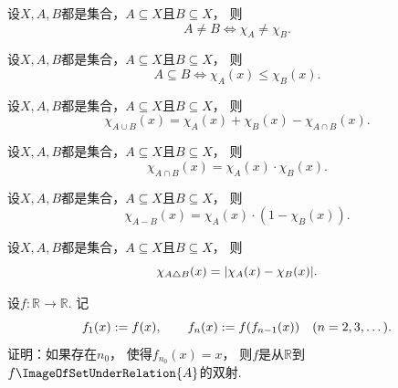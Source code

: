 \begin{proposition}
设\(X,A,B\)都是集合，\(A \subseteq X\)且\(B \subseteq X\)，
则\begin{equation*}
	A \neq B \iff \chi_A \neq \chi_B.
\end{equation*}
\end{proposition}

\begin{proposition}
设\(X,A,B\)都是集合，\(A \subseteq X\)且\(B \subseteq X\)，
则\begin{equation*}
	A \subseteq B
	\iff
	\chi_A(x) \leq \chi_B(x).
\end{equation*}
\end{proposition}

\begin{proposition}
设\(X,A,B\)都是集合，\(A \subseteq X\)且\(B \subseteq X\)，
则\begin{equation*}
	\chi_{A \cup B}(x)
	= \chi_A(x) + \chi_B(x) - \chi_{A \cap B}(x).
\end{equation*}
\end{proposition}

\begin{proposition}
设\(X,A,B\)都是集合，\(A \subseteq X\)且\(B \subseteq X\)，
则\begin{equation*}
	\chi_{A \cap B}(x)
	= \chi_A(x) \cdot \chi_B(x).
\end{equation*}
\end{proposition}

\begin{proposition}
设\(X,A,B\)都是集合，\(A \subseteq X\)且\(B \subseteq X\)，
则\begin{equation*}
	\chi_{A - B}(x)
	= \chi_A(x) \cdot (1 - \chi_B(x)).
\end{equation*}
\end{proposition}

\begin{proposition}
设\(X,A,B\)都是集合，\(A \subseteq X\)且\(B \subseteq X\)，
则\begin{equation*}
	\chi_{A \triangle B}(x)
	= \abs{\chi_A(x) - \chi_B(x)}.
\end{equation*}
\end{proposition}

\begin{example}
设\(f\colon \mathbb{R} \to \mathbb{R}\).
记\begin{equation*}
	f_1(x) := f(x),
	\qquad
	f_n(x) := f(f_{n-1}(x))
	\quad(n=2,3,\dotsc).
\end{equation*}
证明：如果存在\(n_0\)，
使得\(f_{n_0}(x) = x\)，
则\(f\)是从\(\mathbb{R}\)到\(f\ImageOfSetUnderRelation{A}\)的双射.
\end{example}

